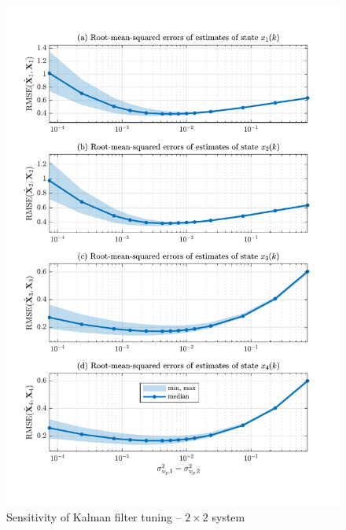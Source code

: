 \begin{figure}[htp]
	\centering
	\includegraphics[width=14cm]{images/rod_obs_sim2_3KF_Q_statplot.pdf}
	\caption{Sensitivity of Kalman filter tuning – $2\times2$ system}
	\label{fig:sim-sys-2x2-KF3-tuning-sens}
\end{figure}

